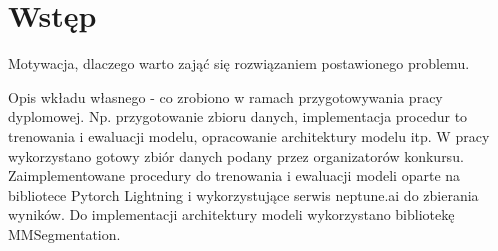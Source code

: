 \newpage %
\section{Wstęp}


Motywacja, dlaczego warto zająć się rozwiązaniem postawionego problemu.

Opis wkładu własnego - co zrobiono w ramach przygotowywania pracy dyplomowej. Np. przygotowanie zbioru danych, implementacja procedur to trenowania i ewaluacji modelu, opracowanie architektury modelu itp.
W pracy wykorzystano gotowy zbiór danych podany przez organizatorów konkursu. Zaimplementowane procedury do trenowania i ewaluacji modeli oparte na bibliotece Pytorch Lightning i wykorzystujące serwis neptune.ai do zbierania wyników. Do implementacji architektury modeli wykorzystano bibliotekę MMSegmentation.
